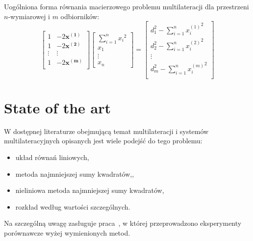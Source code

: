 Uogólniona forma równania macierzowego problemu multilateracji dla przestrzeni $n$-wymiarowej i $m$ odbiorników:
\begin{equation}
    \left[
        \begin{matrix}
            1 & -2\boldsymbol{x^{(1)}}\\
            1 & -2\boldsymbol{x^{(2)}}\\
            \vdots & \vdots\\
            1 & -2\boldsymbol{x^{(m)}}\\
        \end{matrix}
    \right]
    \left[
        \begin{matrix}
            \sum_{i=1}^{n}{x_i}^2\\
            x_1\\
            \vdots\\
            x_n
        \end{matrix}
    \right]
    =
    \left[
        \begin{matrix}
            d_1^2 - \sum_{i=1}^{n}{x_i^{(1)}}^2\\
            d_2^2 - \sum_{i=1}^{n}{x_i^{(2)}}^2\\
            \vdots\\
            d_m^2 - \sum_{i=1}^{n}{x_i^{(m)}}^2\\
        \end{matrix}
    \right]
\end{equation}


\section{State of the art}

W dostępnej literaturze obejmującą temat multilateracji i systemów multilateracyjnych opisanych jest wiele podejść do tego problemu:

\begin{itemize}
    \item układ równań liniowych\cite{murphy1995determination},
    \item metoda najmniejszej sumy kwadratów\cite{murphy1995determination},\cite{norrdine2012algebraic},
    \item nieliniowa metoda najmniejszej sumy kwadratów\cite{murphy1995determination},
    \item rozkład według wartości szczególnych\cite{murphy1995determination}.
\end{itemize}
Na szczególną uwagę zasługuje praca~\cite{murphy1995determination}, w której przeprowadzono eksperymenty porównawcze wyżej wymienionych metod.

